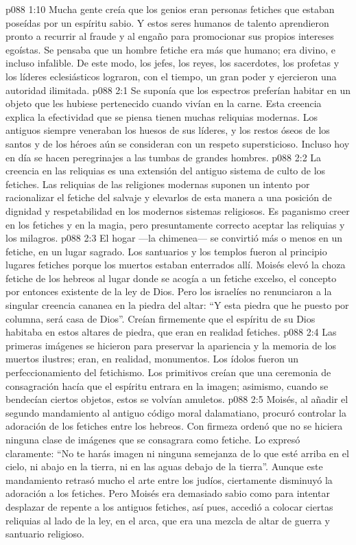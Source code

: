 \vs p088 1:10 Mucha gente creía que los genios eran personas fetiches que estaban poseídas por un espíritu sabio. Y estos seres humanos de talento aprendieron pronto a recurrir al fraude y al engaño para promocionar sus propios intereses egoístas. Se pensaba que un hombre fetiche era más que humano; era divino, e incluso infalible. De este modo, los jefes, los reyes, los sacerdotes, los profetas y los líderes eclesiásticos lograron, con el tiempo, un gran poder y ejercieron una autoridad ilimitada.
\vs p088 2:1 Se suponía que los espectros preferían habitar en un objeto que les hubiese pertenecido cuando vivían en la carne. Esta creencia explica la efectividad que se piensa tienen muchas reliquias modernas. Los antiguos siempre veneraban los huesos de sus líderes, y los restos óseos de los santos y de los héroes aún se consideran con un respeto supersticioso. Incluso hoy en día se hacen peregrinajes a las tumbas de grandes hombres.
\vs p088 2:2 La creencia en las reliquias es una extensión del antiguo sistema de culto de los fetiches. Las reliquias de las religiones modernas suponen un intento por racionalizar el fetiche del salvaje y elevarlos de esta manera a una posición de dignidad y respetabilidad en los modernos sistemas religiosos. Es paganismo creer en los fetiches y en la magia, pero presuntamente correcto aceptar las reliquias y los milagros.
\vs p088 2:3 El hogar ---la chimenea--- se convirtió más o menos en un fetiche, en un lugar sagrado. Los santuarios y los templos fueron al principio lugares fetiches porque los muertos estaban enterrados allí. Moisés elevó la choza fetiche de los hebreos al lugar donde se acogía a un fetiche excelso, el concepto por entonces existente de la ley de Dios. Pero los israelíes no renunciaron a la singular creencia cananea en la piedra del altar: “Y esta piedra que he puesto por columna, será casa de Dios”. Creían firmemente que el espíritu de su Dios habitaba en estos altares de piedra, que eran en realidad fetiches.
\vs p088 2:4 \pc Las primeras imágenes se hicieron para preservar la apariencia y la memoria de los muertos ilustres; eran, en realidad, monumentos. Los ídolos fueron un perfeccionamiento del fetichismo. Los primitivos creían que una ceremonia de consagración hacía que el espíritu entrara en la imagen; asimismo, cuando se bendecían ciertos objetos, estos se volvían amuletos.
\vs p088 2:5 Moisés, al añadir el segundo mandamiento al antiguo código moral dalamatiano, procuró controlar la adoración de los fetiches entre los hebreos. Con firmeza ordenó que no se hiciera ninguna clase de imágenes que se consagrara como fetiche. Lo expresó claramente: “No te harás imagen ni ninguna semejanza de lo que esté arriba en el cielo, ni abajo en la tierra, ni en las aguas debajo de la tierra”. Aunque este mandamiento retrasó mucho el arte entre los judíos, ciertamente disminuyó la adoración a los fetiches. Pero Moisés era demasiado sabio como para intentar desplazar de repente a los antiguos fetiches, así pues, accedió a colocar ciertas reliquias al lado de la ley, en el arca, que era una mezcla de altar de guerra y santuario religioso.
